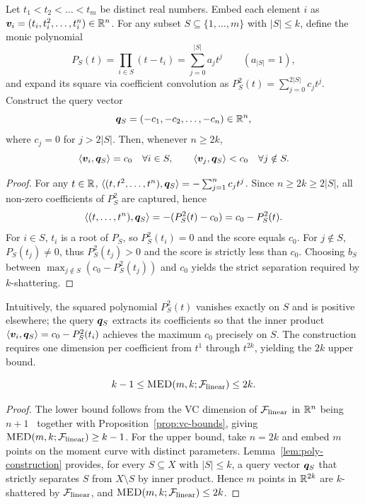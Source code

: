 \begin{lemma}\label{lem:poly-construction}
Let $t_1 < t_2 < \dots < t_m$ be distinct real numbers. Embed each element $i$ as $\bm{v}_i = (t_i, t_i^2, \dots, t_i^n) \in \mathbb{R}^n$. For any subset $S \subseteq \{1,\dots,m\}$ with $|S| \le k$, define the monic polynomial
\[
P_S(t) = \prod_{i \in S} (t - t_i) = \sum_{j=0}^{|S|} a_j t^j \qquad (a_{|S|} = 1),
\]
and expand its square via coefficient convolution as $P_S^2(t) = \sum_{j=0}^{2|S|} c_j t^j$. Construct the query vector
\[
\bm{q}_S = (-c_1, -c_2, \dots, -c_n) \in \mathbb{R}^n,
\]
where $c_j = 0$ for $j > 2|S|$. Then, whenever $n \ge 2k$,
\[
\langle \bm{v}_i, \bm{q}_S \rangle = c_0 \quad \forall i \in S,
\qquad
\langle \bm{v}_j, \bm{q}_S \rangle < c_0 \quad \forall j \notin S.
\]
\end{lemma}
\begin{proof}
For any $t \in \mathbb{R}$, $\langle (t, t^2, \dots, t^n), \bm{q}_S \rangle = -\sum_{j=1}^{n} c_j t^j$. Since $n \ge 2k \ge 2|S|$, all non-zero coefficients of $P_S^2$ are captured, hence
\[
\langle (t, \dots, t^n), \bm{q}_S \rangle = -(P_S^2(t) - c_0) = c_0 - P_S^2(t).
\]
For $i \in S$, $t_i$ is a root of $P_S$, so $P_S^2(t_i) = 0$ and the score equals $c_0$. For $j \notin S$, $P_S(t_j) \neq 0$, thus $P_S^2(t_j) > 0$ and the score is strictly less than $c_0$. Choosing $b_S$ between $\max_{j \notin S} (c_0 - P_S^2(t_j))$ and $c_0$ yields the strict separation required by $k$-shattering.
\end{proof}

Intuitively, the squared polynomial $P_S^2(t)$ vanishes exactly on $S$ and is positive elsewhere; the query $\bm{q}_S$ extracts its coefficients so that the inner product $\langle \bm{v}_i, \bm{q}_S \rangle = c_0 - P_S^2(t_i)$ achieves the maximum $c_0$ precisely on $S$. The construction requires one dimension per coefficient from $t^1$ through $t^{2k}$, yielding the $2k$ upper bound.

\begin{theorem}\label{thm:linear-lower-upper}
    $$k-1\leq \textsc{MED}(m, k; \mathcal{F}_{\rm linear}) \leq 2k.$$
\end{theorem}
\begin{proof}
The lower bound follows from the VC dimension of $\mathcal{F}_{\rm linear}$ in $\mathbb{R}^n$ being $n+1$~\citep{mohri2018foundations} together with Proposition~\ref{prop:vc-bounds}, giving $\textsc{MED}(m,k;\mathcal{F}_{\rm linear}) \ge k-1$. For the upper bound, take $n = 2k$ and embed $m$ points on the moment curve with distinct parameters. Lemma~\ref{lem:poly-construction} provides, for every $S\subseteq X$ with $|S|\le k$, a query vector $\bm{q}_S$ that strictly separates $S$ from $X\setminus S$ by inner product. Hence $m$ points in $\mathbb{R}^{2k}$ are $k$-shattered by $\mathcal{F}_{\rm linear}$, and $\textsc{MED}(m,k;\mathcal{F}_{\rm linear}) \le 2k$.
\end{proof}

